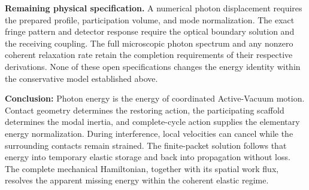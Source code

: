 \medskip
\noindent\textbf{Remaining physical specification.}
A numerical photon displacement requires the prepared profile, participation volume, and mode normalization. The exact fringe pattern and detector response require the optical boundary solution and the receiving coupling. The full microscopic photon spectrum and any nonzero coherent relaxation rate retain the completion requirements of their respective derivations. None of these open specifications changes the energy identity within the conservative model established above.

\medskip
\noindent\textbf{Conclusion:}
Photon energy is the energy of coordinated Active-Vacuum motion. Contact geometry determines the restoring action, the participating scaffold determines the modal inertia, and complete-cycle action supplies the elementary energy normalization. During interference, local velocities can cancel while the surrounding contacts remain strained. The finite-packet solution follows that energy into temporary elastic storage and back into propagation without loss. The complete mechanical Hamiltonian, together with its spatial work flux, resolves the apparent missing energy within the coherent elastic regime.
